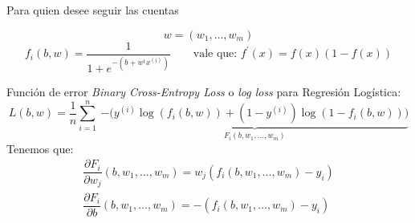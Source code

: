 \documentclass[aspectratio=169, usenames,dvipsnames]{beamer}
\begin{document}
\begin{frame}
    \begin{center}
        Para quien desee seguir las cuentas
    \end{center}
    \[w = (w_1, \dots, w_m)\]
    \[f_i(b,w) = \dfrac{1}{1 + e^{-(b + w^tx^{(i)})}} \qquad \text{vale que: } f^\prime (x)=f(x)(1-f(x))\]

    Función de error \textit{Binary Cross-Entropy Loss} o \textit{log loss} para Regresión Logística:
    \[L(b,w) = {\frac {1}{n}}\sum _{i=1}^{n}\ \underbrace{-{\bigg (}y^{(i)}\log (f_i(b,w))+(1-y^{(i)})\log(1-f_i(b,w)) \bigg)}_{F_i(b,w_1,\dots, w_m)}\]
    Tenemos que:
    \[    
    \begin{array}{l}
         \dfrac{\partial F_i}{\partial w_j}(b, w_1,\dots,w_m) = w_j(f_i(b,w_1,\dots,w_m)-y_i)  \\
          \dfrac{\partial F_i}{\partial b}(b, w_1,\dots,w_m) = -(f_i(b,w_1,\dots,w_m)-y_i)
    \end{array}
    \]
    

\end{frame}
\end{document}
